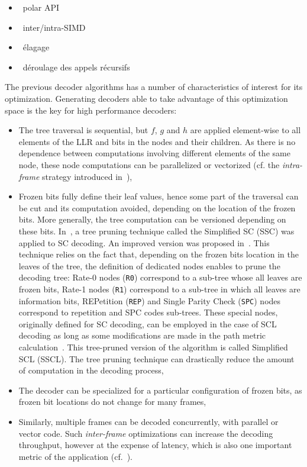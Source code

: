 \begin{itemize}
  \item \cmark~polar API
  \item \cmark~inter/intra-SIMD
  \item \cmark~élagage
  \item \cmark~déroulage des appels récursifs
\end{itemize}

The previous decoder algorithms has a number of characteristics of interest for
its optimization. Generating decoders able to take advantage of this
optimization space is the key for high performance decoders:
\begin{itemize}
  \item The tree traversal is sequential, but $f$, $g$ and $h$ are applied
    element-wise to all elements of the LLR and bits in the nodes and
    their children. As there is no dependence between computations
    involving different elements of the same node, these node computations
    can be parallelized or vectorized (cf. the \emph{intra-frame} strategy
    introduced in~\cite{Giard2014}),
  \item Frozen bits fully define their leaf values, hence some part of the
    traversal can be cut and its computation avoided, depending on the
    location of the frozen bits. More generally, the tree computation can
    be versioned depending on these bits. In~\cite{Alamdar-Yazdi2011}, a tree
    pruning technique called the Simplified SC (SSC) was applied to SC decoding.
    An improved version was proposed in~\cite{Sarkis2014a}. This technique
    relies on the fact that, depending on the frozen bits location in the leaves
    of the tree, the definition of dedicated nodes enables to prune the decoding
    tree: Rate-0 nodes (\texttt{R0}) correspond to a sub-tree whose all leaves
    are frozen bits, Rate-1 nodes (\texttt{R1}) correspond to a sub-tree in
    which all leaves are information bits, REPetition (\texttt{REP}) and Single
    Parity Check (\texttt{SPC}) nodes correspond to repetition and SPC codes
    sub-trees. These special nodes, originally defined for SC decoding, can be
    employed in the case of SCL decoding as long as some modifications are made
    in the path metric calculation~\cite{Sarkis2016}. This tree-pruned version
    of the algorithm is called Simplified SCL (SSCL). The tree pruning technique
    can drastically reduce the amount of computation in the decoding process,
  \item The decoder can be specialized for a particular configuration of frozen
    bits, as frozen bit locations do not change for many frames,
  \item Similarly, multiple frames can be decoded concurrently, with parallel or
    vector code. Such \emph{inter-frame} optimizations can increase the decoding
    throughput, however at the expense of latency, which is also one important
    metric of the application (cf.~\cite{LeGal2015a}).
\end{itemize}


